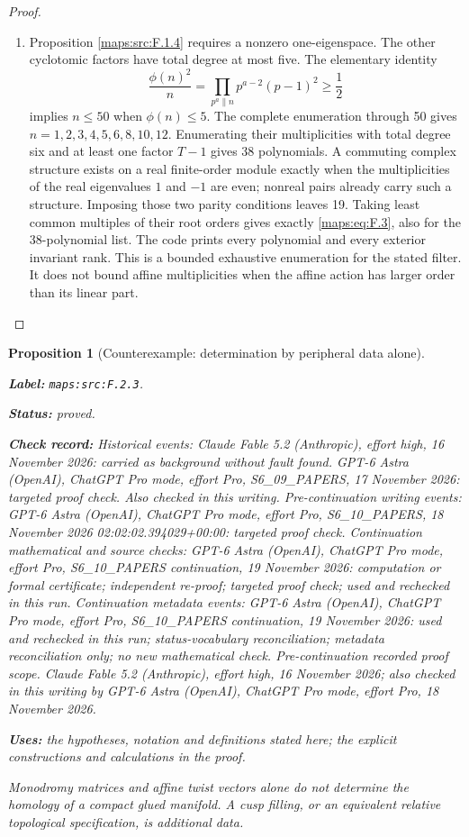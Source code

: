 \documentclass[11pt,a4paper]{article}
\newtheorem{proposition}[proposition]{Proposition}
\theoremstyle{definition}
\newcommand{\StatementRecord}[4]{\par\smallskip\begingroup\upshape\raggedright\noindent\textbf{Label:} \nolinkurl{#1}.\par\noindent\textbf{Status:} #2.\par\noindent\textbf{Check record:} #3.\par\noindent\textbf{Uses:} #4.\par\endgroup\smallskip}
\begin{document}
\begin{proof}
\begin{enumerate}[label=\arabic*.]
\item Proposition \ref{maps:src:F.1.4} requires a nonzero one-eigenspace.  The other
cyclotomic factors have total degree at most five.  The elementary
identity
\[
 \frac{\phi(n)^2}{n}=
 \prod_{p^a\parallel n}p^{a-2}(p-1)^2\geq\frac12
\]
implies $n\leq50$ when $\phi(n)\leq5$.
The complete enumeration through 50 gives
$n=1,2,3,4,5,6,8,10,12$.  Enumerating their multiplicities
with total degree six and at least one factor $T-1$ gives 38
polynomials.  A commuting complex structure exists on a real
finite-order module exactly when the multiplicities of the
real eigenvalues $1$ and $-1$ are even; nonreal pairs already
carry such a structure.  Imposing those two parity conditions
leaves 19.  Taking least common multiples of their root orders
gives exactly \eqref{maps:eq:F.3}, also for the 38-polynomial list.
The code prints every polynomial and every exterior invariant
rank.  This is a bounded exhaustive enumeration for the
stated filter.  It does not bound affine multiplicities when
the affine action has larger order than its linear part.

\end{enumerate}
\end{proof}




\begin{proposition}[Counterexample: determination by peripheral data alone]\label{maps:src:F.2.3}
\StatementRecord{maps:src:F.2.3}{proved}{Historical events: Claude Fable 5.2 (Anthropic), effort high, 16 November 2026: carried as background without fault found. GPT-6 Astra (OpenAI), ChatGPT Pro mode, effort Pro, S6\_09\_PAPERS, 17 November 2026: targeted proof check. Also checked in this writing. Pre-continuation writing events: GPT-6 Astra (OpenAI), ChatGPT Pro mode, effort Pro, S6\_10\_PAPERS, 18 November 2026 02:02:02.394029+00:00: targeted proof check. Continuation mathematical and source checks: GPT-6 Astra (OpenAI), ChatGPT Pro mode, effort Pro, S6\_10\_PAPERS continuation, 19 November 2026: computation or formal certificate; independent re-proof; targeted proof check; used and rechecked in this run. Continuation metadata events: GPT-6 Astra (OpenAI), ChatGPT Pro mode, effort Pro, S6\_10\_PAPERS continuation, 19 November 2026: used and rechecked in this run; status-vocabulary reconciliation; metadata reconciliation only; no new mathematical check. \emph{Pre-continuation recorded proof scope.} Claude Fable 5.2 (Anthropic), effort high, 16 November 2026; also checked in this writing by GPT-6 Astra (OpenAI), ChatGPT Pro mode, effort Pro, 18 November 2026}{the hypotheses, notation and definitions stated here; the explicit constructions and calculations in the proof}


Monodromy matrices and affine twist vectors alone do not
determine the homology of a compact glued manifold.  A cusp
filling, or an equivalent relative topological specification,
is additional data.

\end{proposition}
\end{document}
